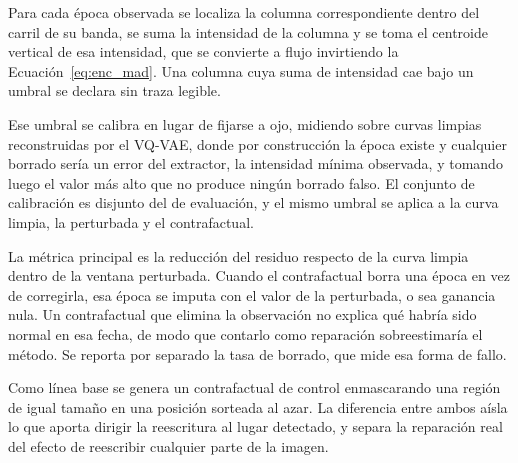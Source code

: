 Para cada época observada se localiza la columna correspondiente dentro del carril de su banda, se suma la intensidad de la columna y se toma el centroide vertical de esa intensidad, que se convierte a flujo invirtiendo la Ecuación~\ref{eq:enc_mad}. Una columna cuya suma de intensidad cae bajo un umbral se declara sin traza legible.

Ese umbral se calibra en lugar de fijarse a ojo, midiendo sobre curvas limpias reconstruidas por el VQ-VAE, donde por construcción la época existe y cualquier borrado sería un error del extractor, la intensidad mínima observada, y tomando luego el valor más alto que no produce ningún borrado falso. El conjunto de calibración es disjunto del de evaluación, y el mismo umbral se aplica a la curva limpia, la perturbada y el contrafactual.

La métrica principal es la reducción del residuo respecto de la curva limpia dentro de la ventana perturbada. Cuando el contrafactual borra una época en vez de corregirla, esa época se imputa con el valor de la perturbada, o sea ganancia nula. Un contrafactual que elimina la observación no explica qué habría sido normal en esa fecha, de modo que contarlo como reparación sobreestimaría el método. Se reporta por separado la tasa de borrado, que mide esa forma de fallo.

Como línea base se genera un contrafactual de control enmascarando una región de igual tamaño en una posición sorteada al azar. La diferencia entre ambos aísla lo que aporta dirigir la reescritura al lugar detectado, y separa la reparación real del efecto de reescribir cualquier parte de la imagen.
